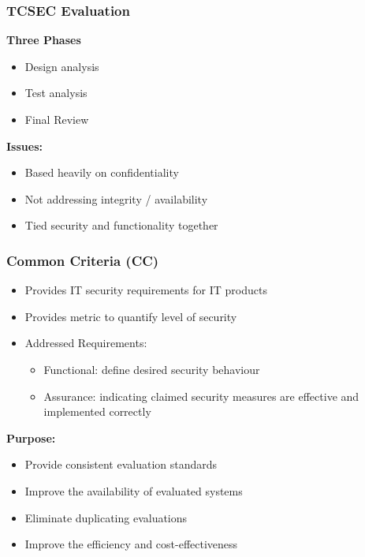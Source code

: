 \subsubsection{TCSEC Evaluation}
\textbf{Three Phases}
\begin{itemize}
    \item Design analysis
    \item Test analysis
    \item Final Review
\end{itemize}
\textbf{Issues:}
\begin{itemize}
    \item Based heavily on confidentiality
    \item Not addressing integrity / availability
    \item Tied security and functionality together
\end{itemize}

\subsubsection{Common Criteria (CC)}
\begin{itemize}
    \item Provides IT security requirements for IT products
    \item Provides metric to quantify level of security
    \item Addressed Requirements:
    \begin{itemize}
        \item Functional: define desired security behaviour
        \item Assurance: indicating claimed security measures are effective and implemented correctly
    \end{itemize}
\end{itemize}
\textbf{Purpose:}
\begin{itemize}
    \item Provide consistent evaluation standards
    \item Improve the availability of evaluated systems
    \item Eliminate duplicating evaluations
    \item Improve the efficiency and cost-effectiveness
\end{itemize}

